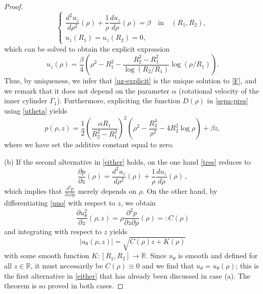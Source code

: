 \documentclass[10pt,a4paper]{amsart}
\begin{document}
\begin{proof}
		\begin{equation*}
			\begin{cases}
				\dfrac{d^2 {u_z}}{d\rho^2}(\rho) +\dfrac{1}{\rho}\dfrac{d{u_z}}{d\rho}(\rho) =\beta \quad \text{in} \quad (R_1,R_2),\\[5pt]
				{u}_{z}(R_1)=  {u}_{z}(R_2)=0,
			\end{cases}
		\end{equation*}which can be solved to obtain the explicit expression
		\begin{equation}\label{uz-explicit}
			{u}_{z}(\rho)=  \frac{\beta}{4} \left(\rho^2-R_1^2 - \frac{R_2^2-R_1^2}{\log (R_2/R_1)}   \log (\rho/R_1)\right).
		\end{equation}
		Thus, by uniqueness, we infer that \eqref{uz-explicit} is the unique solution to \eqref{F}, and we remark that it does not depend on the parameter $\alpha$ (rotational velocity of the inner cylinder $\Gamma_1$).	
		Furthermore, expliciting the function $D(\rho)$ in \eqref{sepa-pres} using \eqref{utheta} yields
		\begin{equation*}
			p(\rho,z)=   \frac{1}{2}\left(\frac{\alpha R_1}{R_2^2-R_1^2} \right)^{2} \left( \rho^{2} - \frac{R_2^4}{\rho^{2}}
			- 4R_2^2 \log\rho \right) + \beta z,
		\end{equation*}
		where we have set the additive constant equal to zero.
		
		(b) If the second alternative in \eqref{either} holds, on the one hand \eqref{tres} reduces to
		$$
		\frac{\partial p}{\partial z}(\rho) = \frac{d^2 u_z}{d\rho^2}(\rho)+\frac{1}{\rho}\frac{d u_z}{d\rho}(\rho)\,,
		$$
		which implies that $\tfrac{\partial^2p}{\partial z\partial\rho}$ merely depends on $\rho$. On the other hand, by differentiating \eqref{uno} with respect to $z$, we obtain
		$$
		\frac{\partial u^2_{\theta}}{\partial z}(\rho,z)=\rho\frac{\partial^2p}{\partial z\partial\rho}(\rho)=: C(\rho)
		$$and integrating with respect to $z$ yields
		\begin{equation}
			| u_\theta (\rho,z)|= \sqrt{C(\rho)z + K(\rho)}
		\end{equation}
		with some smooth function $K: [R_1,R_2] \rightarrow \mathbb{R}$. Since $u_\theta$ is smooth and defined for all $z\in\mathbb{R}$, it must
		necessarily be $C(\rho)\equiv 0$ and we find that $u_\theta=u_\theta(\rho)$; this is the first alternative in \eqref{either}
		that has already been discussed in case (a). The theorem is so proved in both cases.\end{proof}
\end{document}
